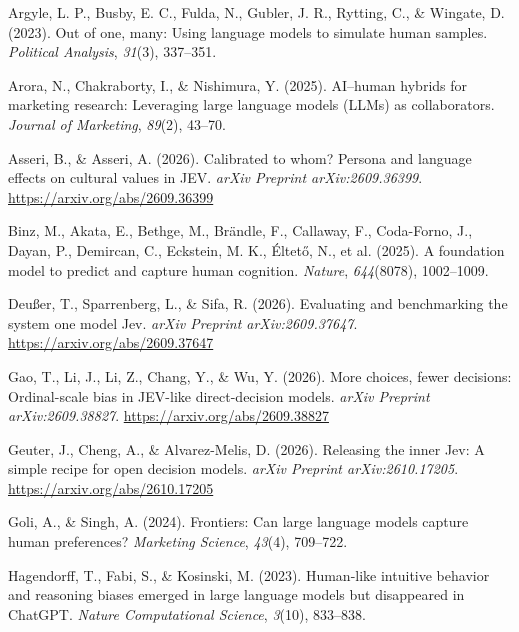 \documentclass[
  11pt,
  letterpaper,
]{article}
\newlength{\cslhangindent}
\newenvironment{CSLReferences}[2] %
 {\begin{list}{}{%
  \setlength{\itemindent}{0pt}
  \setlength{\leftmargin}{0pt}
  \setlength{\parsep}{0pt}
  \ifodd #1
   \setlength{\leftmargin}{\cslhangindent}
   \setlength{\itemindent}{-1\cslhangindent}
  \fi
  \setlength{\itemsep}{#2\baselineskip}}}
 {\end{list}}
\begin{document}
\protect{}\label{refs}
\begin{CSLReferences}{1}{0}
Argyle, L. P., Busby, E. C., Fulda, N., Gubler, J. R., Rytting, C., \&
Wingate, D. (2023). Out of one, many: Using language models to simulate
human samples. \emph{Political Analysis}, \emph{31}(3), 337--351.

Arora, N., Chakraborty, I., \& Nishimura, Y. (2025). AI--human hybrids
for marketing research: Leveraging large language models (LLMs) as
collaborators. \emph{Journal of Marketing}, \emph{89}(2), 43--70.

Asseri, B., \& Asseri, A. (2026). Calibrated to whom? Persona and
language effects on cultural values in {JEV}. \emph{arXiv Preprint
arXiv:2609.36399}. \url{https://arxiv.org/abs/2609.36399}

{Binz, M., Akata, E., Bethge, M., Brändle, F., Callaway, F., Coda-Forno,
J., Dayan, P., Demircan, C., Eckstein, M. K., Éltető, N., et al.}
(2025). A foundation model to predict and capture human cognition.
\emph{Nature}, \emph{644}(8078), 1002--1009.

Deußer, T., Sparrenberg, L., \& Sifa, R. (2026). Evaluating and
benchmarking the system one model {Jev}. \emph{arXiv Preprint
arXiv:2609.37647}. \url{https://arxiv.org/abs/2609.37647}

Gao, T., Li, J., Li, Z., Chang, Y., \& Wu, Y. (2026). More choices,
fewer decisions: Ordinal-scale bias in {JEV}-like direct-decision
models. \emph{arXiv Preprint arXiv:2609.38827}.
\url{https://arxiv.org/abs/2609.38827}

Geuter, J., Cheng, A., \& Alvarez-Melis, D. (2026). Releasing the inner
{Jev}: A simple recipe for open decision models. \emph{arXiv Preprint
arXiv:2610.17205}. \url{https://arxiv.org/abs/2610.17205}

Goli, A., \& Singh, A. (2024). Frontiers: Can large language models
capture human preferences? \emph{Marketing Science}, \emph{43}(4),
709--722.

Hagendorff, T., Fabi, S., \& Kosinski, M. (2023). Human-like intuitive
behavior and reasoning biases emerged in large language models but
disappeared in ChatGPT. \emph{Nature Computational Science},
\emph{3}(10), 833--838.


\end{CSLReferences}
\end{document}
